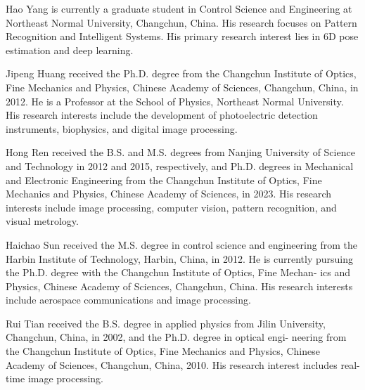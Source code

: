 \documentclass[a4paper,fleqn]{cas-sc}
\begin{document}
Hao Yang is currently a graduate student in Control Science and Engineering at Northeast Normal University, Changchun, China. His research focuses on Pattern Recognition and Intelligent Systems. His primary research interest lies in 6D pose estimation and deep learning.
\endbio

\vskip6pc

Jipeng Huang received the Ph.D. degree from the Changchun Institute of Optics, Fine Mechanics and Physics, Chinese Academy of Sciences, Changchun, China, in 2012. He is a Professor at the School of Physics, Northeast Normal University. His research interests include the development of photoelectric detection instruments, biophysics, and digital image processing.

\endbio


\vskip6pc

Hong Ren received the B.S. and M.S. degrees from Nanjing University of Science and Technology in 2012 and 2015, respectively, and Ph.D. degrees in Mechanical and Electronic Engineering from the Changchun Institute of Optics, Fine Mechanics and Physics, Chinese Academy of Sciences, in 2023. His research interests include image processing, computer vision, pattern recognition, and visual metrology.

\endbio


\vskip6pc

Haichao Sun received the M.S. degree in
control science and engineering from the Harbin
Institute of Technology, Harbin, China, in 2012.
He is currently pursuing the Ph.D. degree with
the Changchun Institute of Optics, Fine Mechan-
ics and Physics, Chinese Academy of Sciences,
Changchun, China. His research interests include
aerospace communications and image processing.

\endbio

\vskip6pc
Rui Tian received the B.S. degree in applied
physics from Jilin University, Changchun, China,
in 2002, and the Ph.D. degree in optical engi-
neering from the Changchun Institute of Optics,
Fine Mechanics and Physics, Chinese Academy of
Sciences, Changchun, China, 2010. His research
interest includes real-time image processing.

\endbio
\end{document}
